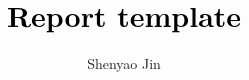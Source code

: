 \documentclass[journal]{IEEEtran}
\begin{document}
\title{\textcolor{black}{Report template}}      

\author{Shenyao Jin} 


\maketitle


\end{document}
